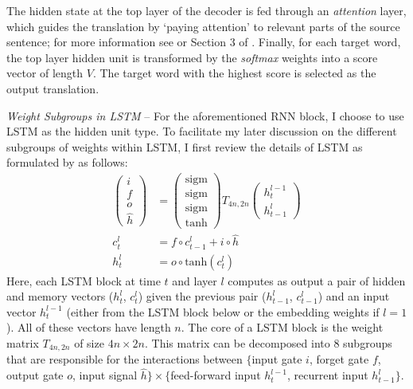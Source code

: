 The hidden state at the top layer of the decoder is fed through an
\textit{attention} layer, which guides the translation by `paying attention' to relevant parts of the source sentence; 
for more information see \cite{bog15} or Section 3 of \cite{luong15attn}.
Finally, for each target word, the top layer hidden unit is transformed by the
\emph{softmax} weights into a score vector of length $V$. The target word with the highest score is selected as the output translation.

{\it Weight Subgroups in LSTM} -- For the aforementioned RNN block, I choose to
use LSTM as the hidden unit type. To facilitate my later discussion 
on the different subgroups of weights
within LSTM, I first review the details of LSTM as formulated by 
 as follows:
\begin{align}
\begin{pmatrix}
i\\
f\\
o\\
\hat{h}
\end{pmatrix}
&=
\begin{pmatrix}
\text{sigm}\\
\text{sigm}\\
\text{sigm}\\
\text{tanh}
\end{pmatrix}
T_{4n,2n}
\begin{pmatrix}
h_t^{l-1}\\
h_{t-1}^l
\end{pmatrix} \label{eqn:lstm_1} \\
c_t^l&=f \circ c_{t-1}^l + i \circ \hat{h} \label{eqn:lstm_2} \\
h_t^l &= o \circ \text{tanh}(c_t^l) \label{eqn:lstm_3}
\end{align}
Here, each LSTM block at time $t$ and layer $l$ computes as output a pair of
hidden and memory vectors ($h_t^l$, $c_t^l$) given the previous pair
($h_{t-1}^l$, $c_{t-1}^l$) and an input vector $h_t^{l-1}$ (either from the LSTM block below or
the embedding weights if $l\!=\!1$). All of these vectors
have length $n$.
The core of a LSTM block is the weight matrix $T_{4n,2n}$ of size $4n \times
2n$. This matrix can be decomposed into 8 subgroups that are responsible for the
interactions between $\{$input gate $i$, forget gate $f$, output gate $o$,
input signal $\hat{h}\} \times \{$feed-forward input $h_t^{l-1}$, recurrent
input $h_{t-1}^l\}$.

